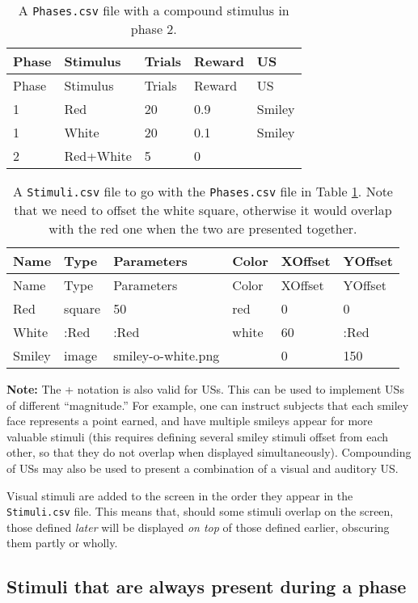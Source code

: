 \documentclass[11pt,]{article}
\begin{document}
\begin{longtable}[c]{@{}lllll@{}}
\caption{A \texttt{Phases.csv} file with a compound stimulus in phase 2.
\label{phases-plus}}\tabularnewline
\toprule
Phase & Stimulus & Trials & Reward & US\tabularnewline
\midrule
\endfirsthead
\toprule
Phase & Stimulus & Trials & Reward & US\tabularnewline
\midrule
\endhead
1 & Red & 20 & 0.9 & Smiley\tabularnewline
1 & White & 20 & 0.1 & Smiley\tabularnewline
2 & Red+White & 5 & 0 &\tabularnewline
\bottomrule
\end{longtable}

\begin{longtable}[c]{@{}llllll@{}}
\caption{A \texttt{Stimuli.csv} file to go with the \texttt{Phases.csv}
file in Table \ref{phases-plus}. Note that we need to offset the white
square, otherwise it would overlap with the red one when the two are
presented together. \label{stimuli-plus}}\tabularnewline
\toprule
Name & Type & Parameters & Color & XOffset & YOffset\tabularnewline
\midrule
\endfirsthead
\toprule
Name & Type & Parameters & Color & XOffset & YOffset\tabularnewline
\midrule
\endhead
Red & square & 50 & red & 0 & 0\tabularnewline
White & :Red & :Red & white & 60 & :Red\tabularnewline
Smiley & image & smiley-o-white.png & & 0 & 150\tabularnewline
\bottomrule
\end{longtable}

\textbf{Note:} The + notation is also valid for USs. This can be used to
implement USs of different ``magnitude.'' For example, one can instruct
subjects that each smiley face represents a point earned, and have
multiple smileys appear for more valuable stimuli (this requires
defining several smiley stimuli offset from each other, so that they do
not overlap when displayed simultaneously). Compounding of USs may also
be used to present a combination of a visual and auditory US.


Visual stimuli are added to the screen in the order they appear in the
\texttt{Stimuli.csv} file. This means that, should some stimuli overlap
on the screen, those defined \emph{later} will be displayed \emph{on
top} of those defined earlier, obscuring them partly or wholly.

\subsection{Stimuli that are always present during a
phase}\label{stimuli-that-are-always-present-during-a-phase}
\end{document}
